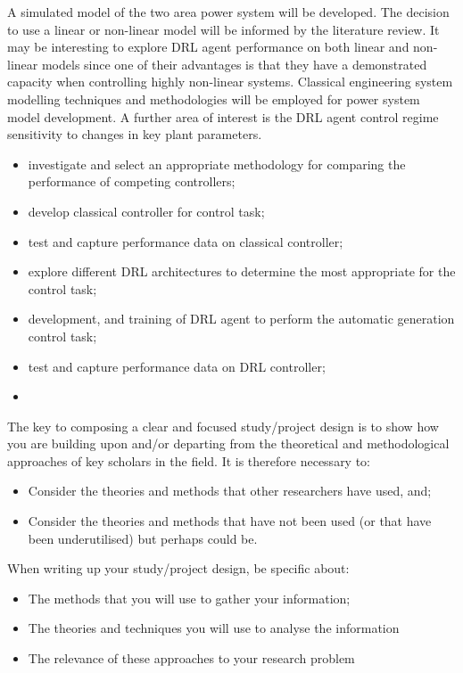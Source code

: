 \documentclass[12pt, a4paper]{article}
\begin{document}
A simulated model of the two area power system will be developed. The decision to use a linear or non-linear model will be informed by the literature review. It may be interesting to explore DRL agent performance on both linear and non-linear models since one of their advantages is that they have a demonstrated capacity when controlling highly non-linear systems. Classical engineering system modelling techniques and methodologies will be employed for power system model development. A further area of interest is the DRL agent control regime sensitivity to changes in key plant parameters.\\

\begin{itemize}
	
	\item investigate and select an appropriate methodology for comparing the performance of competing controllers;
	\item develop classical controller for control task;
	\item test and capture performance data on classical controller;
	\item explore different DRL architectures to determine the most appropriate for the control task;
	\item development, and training of DRL agent to perform the automatic generation control task;
	\item test and capture performance data on DRL controller;
	\item
	
\end{itemize}


The key to composing a clear and focused study/project design is to show how you are building upon and/or departing from the theoretical and methodological approaches of key scholars in the field. It is therefore necessary to:
\begin{itemize}
\item Consider the theories and methods that other researchers have used, and;
\item Consider the theories and methods that have not been used (or that have been underutilised) but perhaps could be.
\end{itemize}

When writing up your study/project design, be specific about:
\begin{itemize}
\item The methods that you will use to gather your information;
\item The theories and techniques you will use to analyse the information
\item The relevance of these approaches to your research problem
\end{itemize}
\end{document}
